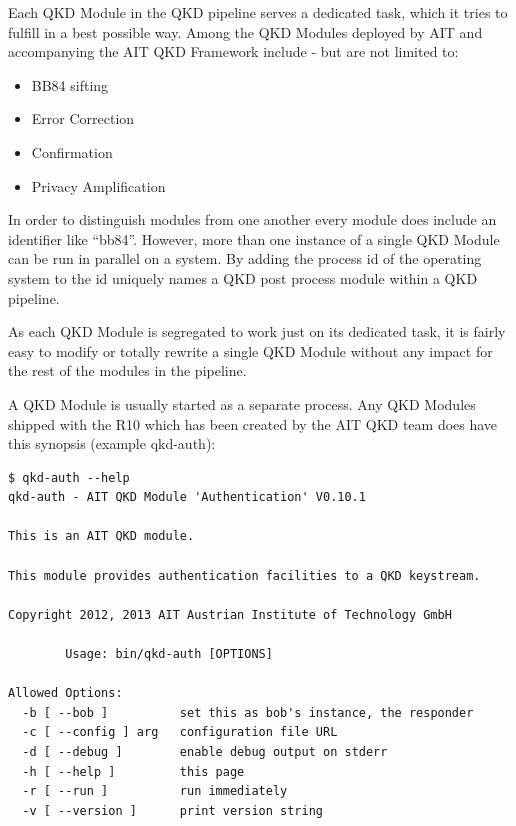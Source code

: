 \medskip

Each QKD Module in the QKD pipeline serves a dedicated task, which it tries to fulfill in a best possible way. Among the QKD Modules deployed by AIT and accompanying the AIT QKD Framework include - but are not limited to:

\begin{itemize}

    \item BB84 sifting

    \item Error Correction

    \item Confirmation

    \item Privacy Amplification

\end{itemize}

In order to distinguish modules from one another every module does include an identifier like ``bb84''. However, more than one instance of a single QKD Module can be run in parallel on a system. By adding the process id of the operating system to the id uniquely names a QKD post process module within a QKD pipeline.

\medskip

As each QKD Module is segregated to work just on its dedicated task, it is fairly easy to modify or totally rewrite a single QKD Module without any impact for the rest of the modules in the pipeline.

\medskip

A QKD Module is usually started as a separate process. Any QKD Modules shipped with the R10 which has been created by the AIT QKD team does have this synopsis (example qkd-auth):

\begin{minipage}{0.9\textwidth}
\bigskip
\begin{verbatim}
$ qkd-auth --help
qkd-auth - AIT QKD Module 'Authentication' V0.10.1

This is an AIT QKD module.

This module provides authentication facilities to a QKD keystream.

Copyright 2012, 2013 AIT Austrian Institute of Technology GmbH

        Usage: bin/qkd-auth [OPTIONS]

Allowed Options:
  -b [ --bob ]          set this as bob's instance, the responder
  -c [ --config ] arg   configuration file URL
  -d [ --debug ]        enable debug output on stderr
  -h [ --help ]         this page
  -r [ --run ]          run immediately
  -v [ --version ]      print version string
\end{verbatim}
\medskip
\end{minipage}

